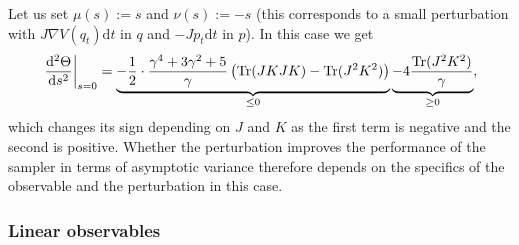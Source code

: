 \begin{example}
\label{ex:opposed perturbation}
	Let us set $\mu(s):=s$ and $\nu(s):=-s$ (this corresponds to a small
	perturbation with $J\nabla V(q_{t})\mathrm{d}t$ in $q$ and $-Jp_{t}\mathrm{d}t$
	in $p$). In this case we get 
	\[
	\left. \frac{\mathrm{d}^{2}\Theta}{\mathrm{d}s^{2}} \right\rvert_{s=0}=\underbrace{-\frac{1}{2}\cdot\frac{\gamma^{4}+3\gamma^{2}+5}{\gamma}\left(\operatorname{Tr}(JKJK)-\operatorname{Tr}(J^{2}K^{2})\right)}_{\le0}\underbrace{-4\frac{\operatorname{Tr}(J^{2}K^{2})}{\gamma}}_{\ge0},
	\]
	which changes its sign depending on $J$ and $K$ as the first term
	is negative and the second is positive. Whether the perturbation improves the performance of the sampler in terms of asymptotic variance therefore depends on the specifics of the observable and the perturbation in this case.
	
\end{example}

\subsubsection{Linear observables}

